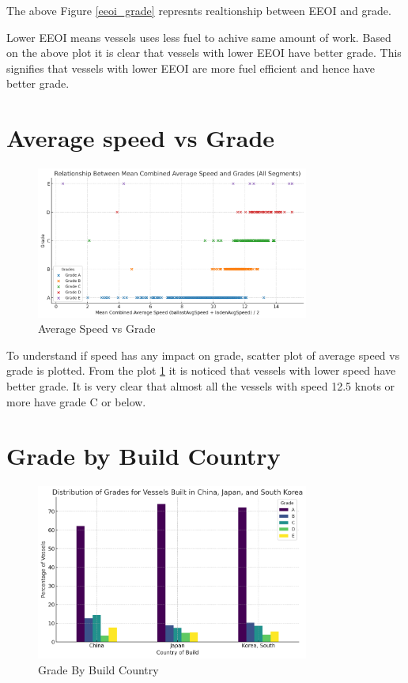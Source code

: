 The above Figure \ref{eeoi_grade} represnts realtionship between EEOI and grade.

Lower EEOI means vessels uses less fuel to achive same amount of work.
Based on the above plot it is clear that vessels with lower EEOI have better grade.
This signifies that vessels with lower EEOI are more fuel efficient and hence have better grade.

\section{Average speed vs Grade}
\begin{figure}[h]
    \centering
    \includegraphics[width=0.8\textwidth]{images/grade_speed.png}
    \caption{Average Speed vs Grade}
    \label{grade_speed}
\end{figure}

To understand if speed has any impact on grade, scatter plot of average speed vs grade is plotted.
From the plot \ref{grade_speed} it is noticed that vessels with lower speed have better grade. 
It is very clear that almost all the vessels with speed 12.5 knots or more have grade C or below.

\section{Grade by Build Country}

\begin{figure}[h]
    \centering
    \includegraphics[width=0.8\textwidth]{images/grade_by_build_country.png}
    \caption{Grade By Build Country}
    \label{grade_by_build_country}
\end{figure}

